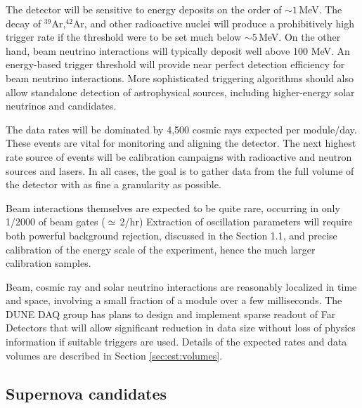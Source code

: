 \documentclass[../main-v1.tex]{subfiles}
\begin{document}
The detector will be sensitive to energy deposits on the order of $\sim 1$\,MeV. The decay of $^{39}$Ar,$^{42}$Ar, and other radioactive nuclei will produce a prohibitively high trigger rate if the threshold were to be set much below $\sim 5$\,MeV. On the other hand, beam neutrino interactions will typically deposit well above 100 MeV. An energy-based trigger threshold will provide near perfect detection efficiency for beam neutrino interactions.
More sophisticated triggering algorithms should also allow standalone detection of astrophysical sources, including higher-energy solar neutrinos and  candidates. 

The data rates will be dominated by 4,500 cosmic rays expected per module/day.  These events are vital for monitoring and aligning the detector. %
The next highest rate source of events will be calibration campaigns with radioactive and neutron sources and lasers.  In all cases, the goal is to gather data from the full volume of the detector with as fine a granularity as possible. 

Beam interactions themselves are expected to be quite rare, occurring in only 1/2000 of beam gates ($\simeq$\,2/hr)  Extraction of oscillation parameters will require both powerful background rejection, discussed in the Section 1.1, and precise calibration of the energy scale of the experiment, hence the much larger calibration samples.

Beam, cosmic ray and solar neutrino interactions are reasonably localized in time and space, involving a small fraction of a module over a few milliseconds.  The DUNE DAQ group has plans to design and implement sparse readout of Far Detectors that will allow significant reduction in data size without loss of physics information if suitable triggers are used. Details of the expected rates and data volumes are described in Section \ref{sec:est:volumes}.



\subsection{Supernova candidates }\label{sec:supernova}
\end{document}
